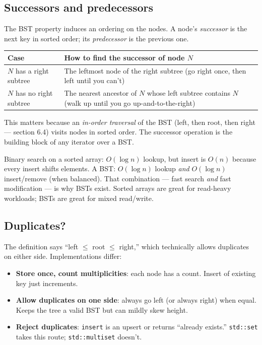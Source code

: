 \documentclass[11pt]{article}
\begin{document}
\subsection*{Successors and predecessors}

The BST property induces an ordering on the nodes. A node's
\emph{successor} is the next key in sorted order; its
\emph{predecessor} is the previous one.

\begin{center}
\begin{tabular}{|l|p{9cm}|}
\hline
\textbf{Case} & \textbf{How to find the successor of node $N$} \\
\hline
$N$ has a right subtree & The leftmost node of the right subtree (go right once, then left until you can't) \\
$N$ has no right subtree & The nearest ancestor of $N$ whose left subtree contains $N$ (walk up until you go up-and-to-the-right) \\
\hline
\end{tabular}
\end{center}

This matters because an \emph{in-order traversal} of the BST
(left, then root, then right --- section 6.4) visits nodes in
sorted order. The successor operation is the building block of
any iterator over a BST.

\begin{ideabox}
Binary search on a sorted array: $O(\log n)$ lookup, but insert
is $O(n)$ because every insert shifts elements. A BST: $O(\log n)$
lookup \emph{and} $O(\log n)$ insert/remove (when balanced). That
combination --- fast search \emph{and} fast modification --- is
why BSTs exist. Sorted arrays are great for read-heavy workloads;
BSTs are great for mixed read/write.
\end{ideabox}

\subsection*{Duplicates?}

The definition says ``left $\leq$ root $\leq$ right,'' which
technically allows duplicates on either side. Implementations
differ:

\begin{itemize}[leftmargin=*]
    \item \textbf{Store once, count multiplicities}: each node
          has a count. Insert of existing key just increments.
    \item \textbf{Allow duplicates on one side}: always go left
          (or always right) when equal. Keeps the tree a valid
          BST but can mildly skew height.
    \item \textbf{Reject duplicates}: \texttt{insert} is an
          upsert or returns ``already exists.''
          \texttt{std::set} takes this route; \texttt{std::multiset}
          doesn't.
\end{itemize}
\end{document}
